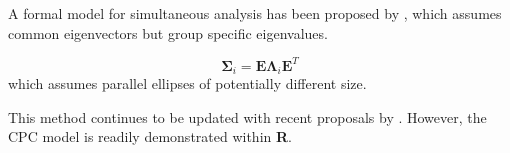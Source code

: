 A formal model for simultaneous analysis has been proposed by \cite{Flury:1984}, which assumes common eigenvectors but group specific eigenvalues.

\begin{displaymath}
\boldsymbol{\Sigma}_{i} = \boldsymbol{E} \boldsymbol{\Lambda}_{i}  \boldsymbol{E}^{T}
\end{displaymath}
which assumes parallel ellipses of potentially different size.

This method continues to be updated with recent proposals by \cite{Boik:2002}.  However, the CPC model is readily demonstrated within \textbf{R}.








%










